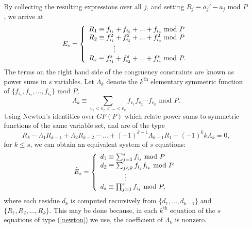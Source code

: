 By collecting the resulting expressions over all $j$, and setting
$R_j \equiv a_j'-a_j$ mod $P$, we arrive at
\begin{equation}
E_s=\left\{
\begin{array}{ll}
R_1 \equiv f_{i_1}+f_{i_2}+...+f_{i_s} \text{ mod }P\\
R_2 \equiv f_{i_1}^2+f_{i_2}^2+...+f_{i_s}^2 \text{ mod } P\\
\hspace{0.5in}\vdots\\
R_s \equiv f_{i_1}^s+f_{i_2}^s+...+f_{i_s}^s \text{ mod } P.\\
\end{array} \right.
\end{equation}
The terms on the right hand side of the congruency constraints are
known as power sums in $s$ variables. %
Let $\Lambda_k$ denote the $k^{\text{th}}$ elementary symmetric
function of  $\{f_{i_1},f_{i_2},...,f_{i_s}\}$ mod $P$,
\begin{equation}
\Lambda_k \equiv \sum_{v_1<v_2<...<v_k} f_{v_1}f_{v_2}\cdots
f_{v_k} \text{ mod } P.
\end{equation}
Using Newton's identities over $GF(P)$ which relate power sums to
symmetric functions of the same variable set, and are of the type
\begin{equation}\label{newton}
R_k-\Lambda_{1}R_{k-1}+\Lambda_{2}R_{k-2}-...+(-1)^{k-1}\Lambda_{k-1}R_{1}+(-1)^kk\Lambda_{k}
=0,
\end{equation}
for $k \leq s$, we can obtain an equivalent system of $s$
equations:
\begin{equation} \label{eq:dcoeff}
\widetilde{E}_s=\left\{
\begin{array}{ll}
d_1 \equiv \sum_{j=1}^s f_{i_j} \text{ mod }P\\
d_2 \equiv \sum_{j<k} f_{i_j} f_{i_k}\text{ mod }P\\
\hspace{0.5in}\vdots \\
d_s \equiv \prod_{j=1}^s f_{i_j} \text{ mod }P,
\end{array} \right.
\end{equation}
where each residue $d_k$ is computed recursively from
$\{d_1,...,d_{k-1}\}$ and $\{R_1,R_2,...,R_k\}$. This may be done
because, in each $k^{\text{th}}$ equation of the $s$ equations of
type (\ref{newton}) we use, the coefficient of $\Lambda_k$ is
nonzero.

